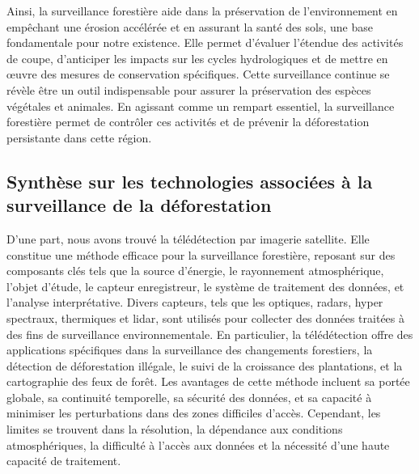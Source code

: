 Ainsi, la surveillance forestière aide dans la préservation de l'environnement en empêchant une érosion accélérée et en assurant la santé des sols, une base fondamentale pour notre existence. Elle permet d'évaluer l'étendue des activités de coupe, d'anticiper les impacts sur les cycles hydrologiques et de mettre en œuvre des mesures de conservation spécifiques. Cette surveillance continue se révèle être un outil indispensable pour assurer la préservation des espèces végétales et animales. En agissant comme un rempart essentiel, la surveillance forestière permet de contrôler ces activités et de prévenir la déforestation persistante dans cette région.
\\

\subsection{Synthèse sur les technologies associées à la surveillance de la déforestation}
D’une part, nous avons trouvé la télédétection par imagerie satellite. Elle constitue une méthode efficace pour la surveillance forestière, reposant sur des composants clés tels que la source d'énergie, le rayonnement atmosphérique, l'objet d'étude, le capteur enregistreur, le système de traitement des données, et l'analyse interprétative. Divers capteurs, tels que les optiques, radars, hyper spectraux, thermiques et lidar, sont utilisés pour collecter des données traitées à des fins de surveillance environnementale. En particulier, la télédétection offre des applications spécifiques dans la surveillance des changements forestiers, la détection de déforestation illégale, le suivi de la croissance des plantations, et la cartographie des feux de forêt. Les avantages de cette méthode incluent sa portée globale, sa continuité temporelle, sa sécurité des données, et sa capacité à minimiser les perturbations dans des zones difficiles d'accès. Cependant, les limites se trouvent dans la résolution, la dépendance aux conditions atmosphériques, la difficulté à l’accès aux données et la nécessité d’une haute capacité de traitement.
\\

